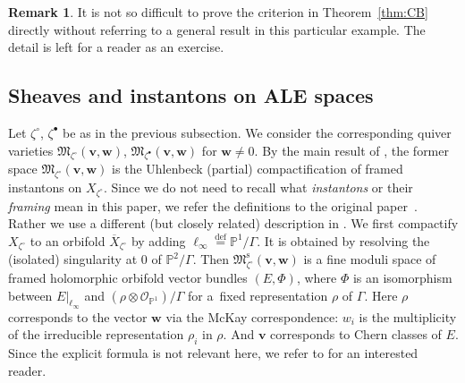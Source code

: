 \documentclass[pdftex]{sigma}
\theoremstyle{definition}
\newtheorem{Remark}[equation]{Remark}
\numberwithin{equation}{section}
\newcommand{\thmref}[1]{Theorem~\ref{#1}}
\newcommand{\defeq}{\overset{\operatorname{\scriptstyle def}}{=}}
\newcommand{\proj}{{\mathbb P}}
\newcommand{\M}{{\mathfrak M}} %
\newcommand{\Mreg}{\M^{\operatorname{s}}}
\newcommand{\bv}{{\mathbf v}} %
\newcommand{\bw}{{\mathbf w}} %
\newcommand{\shfO}{\mathcal O}
\newcommand{\linf}{\ell_\infty}
\begin{document}
\begin{Remark}
  It is not so dif\/f\/icult to prove the criterion in \thmref{thm:CB}
  directly without referring to a general result \cite{CB} in this
  particular example. The detail is left for a reader as an exercise.
\end{Remark}


\subsection{Sheaves and instantons on ALE spaces}\label{subsec:sheaf}

Let $\zeta^\circ$, $\zeta^\bullet$ be as in the previous subsection.
We consider the corresponding quiver varieties
$\M_{\zeta^\circ}(\bv,\bw)$, $\M_{\zeta^\bullet}(\bv,\bw)$ for
$\bw\neq 0$.
%
By the main result of \cite{KN}, the former space
$\M_{\zeta^\circ}(\bv,\bw)$ is the Uhlenbeck (partial)
compactif\/ication of framed instantons on $X_{\zeta^\circ}$. Since we
do not need to recall what {\it instantons\/} or their {\it framing\/}
mean in this paper, we refer the def\/initions to the original paper~\cite{KN}.
%
Rather we use a dif\/ferent (but closely related) description in
\cite{Na-ADHM}. We f\/irst compactify $X_{\zeta^\circ}$ to an orbifold
$\overline{X}_{\zeta^\circ}$ by adding $\linf \defeq \proj^1/\Gamma$.
It is obtained by resolving the (isolated) singularity at $0$ of
$\proj^2/\Gamma$. Then $\Mreg_{\zeta^\circ}(\bv,\bw)$ is a f\/ine moduli
space of framed holomorphic orbifold vector bundles $(E,\Phi)$, where
$\Phi$ is an isomorphism between $E|_{\linf}$ and
$(\rho\otimes\shfO_{\proj^1})/\Gamma$ for a~f\/ixed representation
$\rho$ of $\Gamma$. Here $\rho$ corresponds to the vector $\bw$ via
the McKay correspondence: $w_i$ is the multiplicity of the irreducible
representation $\rho_i$ in $\rho$. And $\bv$ corresponds to Chern
classes of $E$. Since the explicit formula is not relevant here, we
refer to \cite[(1.9)]{Na-ADHM} for an interested reader.
\end{document}
